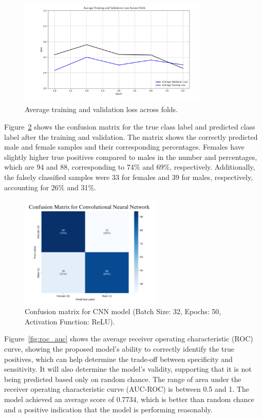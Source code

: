 \begin{figure}[!htbp]
	\centering
	\includegraphics[width=0.8\textwidth]{figures/avg_loss.png}
	\caption{Average training and validation loss across folds.}
	\label{fig:atvlaf}
\end{figure}

\newpage
Figure~\ref{fig:cm_dl} shows the confusion matrix for the true class label and predicted class label after the training and validation. The matrix shows the correctly predicted male and female samples and their corresponding percentages. Females have slightly higher true positives compared to males in the number and percentages, which are 94 and 88, corresponding to 74\% and 69\%, respectively. Additionally, the falsely classified samples were 33 for females and 39 for males, respectively, accounting for 26\% and 31\%.

\begin{figure}[!htbp]
	\centering
	\includegraphics[width=0.6\textwidth]{figures/cm_dl.png}
	\caption{Confusion matrix for CNN model (Batch Size: 32, Epochs: 50, Activation Function: ReLU).}
	\label{fig:cm_dl}
\end{figure}

\newpage
Figure~\ref{fig:roc_auc} shows the average receiver operating characteristic (ROC) curve, showing the proposed model’s ability to correctly identify the true positives, which can help determine the trade-off between specificity and sensitivity. It will also determine the model's validity, supporting that it is not being predicted based only on random chance. The range of area under the receiver operating characteristic curve (AUC-ROC) is between 0.5 and 1. The model achieved an average score of 0.7734, which is better than random chance and a positive indication that the model is performing reasonably.


